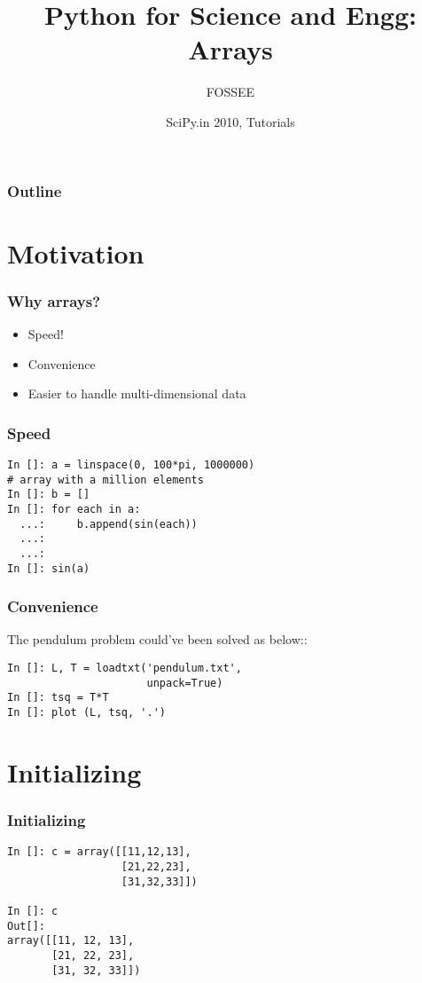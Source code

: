 \documentclass[14pt,compress]{beamer}
\title[Arrays]{Python for Science and Engg: \\Arrays}
\author[FOSSEE] {FOSSEE}
\institute[IIT Bombay] {Department of Aerospace Engineering\\IIT Bombay}
\date[] {SciPy.in 2010, Tutorials}
\begin{document}
\begin{frame}
  \titlepage
\end{frame}

\begin{frame}
  \frametitle{Outline}
  \tableofcontents
\end{frame}
\section{Motivation}

\begin{frame}[fragile]
  \frametitle{Why arrays?}
  \begin{itemize}
  \item Speed!
  \item Convenience
  \item Easier to handle multi-dimensional data
  \end{itemize}
\end{frame}

\begin{frame}[fragile]
  \frametitle{Speed}
    \begin{lstlisting}
In []: a = linspace(0, 100*pi, 1000000) 
# array with a million elements
In []: b = []
In []: for each in a:
  ...:     b.append(sin(each))
  ...:     
  ...:     
In []: sin(a)
  \end{lstlisting}
\end{frame}

\begin{frame}[fragile]
  \frametitle{Convenience}
The pendulum problem could've been solved as below::
    \begin{lstlisting}
In []: L, T = loadtxt('pendulum.txt', 
                      unpack=True)
In []: tsq = T*T
In []: plot (L, tsq, '.')
  \end{lstlisting}
\end{frame}

\section{Initializing}
\begin{frame}[fragile]
\frametitle{Initializing}
\begin{lstlisting}
In []: c = array([[11,12,13],
                  [21,22,23],
                  [31,32,33]])

In []: c
Out[]: 
array([[11, 12, 13],
       [21, 22, 23],
       [31, 32, 33]])
\end{lstlisting}
\end{frame}
\end{document}
